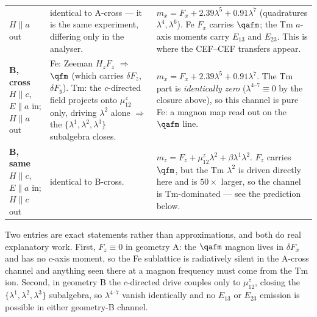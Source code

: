 \begin{table}[h]
\begin{tabular}{p{2.1cm}p{5.2cm}p{7.4cm}}
$H\!\parallel\!a$ out
& identical to A-cross --- it is the same experiment, differing only in
  the analyser.
& $m_x=F_x+2.39\lambda^5+0.91\lambda^7$ (quadratures
  $\lambda^{4},\lambda^{6}$).\newline
  Fe $F_x$ carries $\qafm$; the Tm $a$-axis moments carry $E_{13}$ and
  $E_{23}$.  This is where the CEF--CEF transfers appear.\\
\textbf{B, cross}\newline $H\!\parallel\!c$, $E\!\parallel\!a$ in;
$H\!\parallel\!a$ out
& Fe: Zeeman $H_z F_z$ $\Rightarrow$ $\qfm$ (which carries
  $\delta F_z$, $\delta F_y$).\newline
  Tm: the $c$-directed field projects onto $\mu^z_{12}$ only, driving
  $\lambda^2$ alone $\Rightarrow$ the $\{\lambda^1,\lambda^2,\lambda^3\}$
  subalgebra closes.
& $m_x=F_x+2.39\lambda^5+0.91\lambda^7$.\newline
  The Tm part is \emph{identically zero} ($\lambda^{4\text{--}7}\equiv0$
  by the closure above), so this channel is pure Fe: a magnon map read
  out on the $\qafm$ line.\\
\textbf{B, same}\newline $H\!\parallel\!c$, $E\!\parallel\!a$ in;
$H\!\parallel\!c$ out
& identical to B-cross.
& $m_z=F_z+\mu^z_{12}\lambda^2+\beta\lambda^1\lambda^2$.\newline
  $F_z$ carries $\qfm$, but the Tm $\lambda^2$ is driven directly here
  and is $50\times$ larger, so the channel is Tm-dominated --- see the
  prediction below.\\
\bottomrule
\end{tabular}
\end{table}

Two entries are exact statements rather than approximations, and both do
real explanatory work.  First, $F_z\equiv0$ in geometry A: the $\qafm$
magnon lives in $\delta F_x$ and has no $c$-axis moment, so the Fe
sublattice is radiatively silent in the A-cross channel and anything
seen there at a magnon frequency must come from the Tm ion.  Second, in
geometry B the $c$-directed drive couples only to $\mu^z_{12}$, closing
the $\{\lambda^1,\lambda^2,\lambda^3\}$ subalgebra, so
$\lambda^{4\text{--}7}$ vanish identically and no $E_{13}$ or $E_{23}$
emission is possible in either geometry-B channel.
